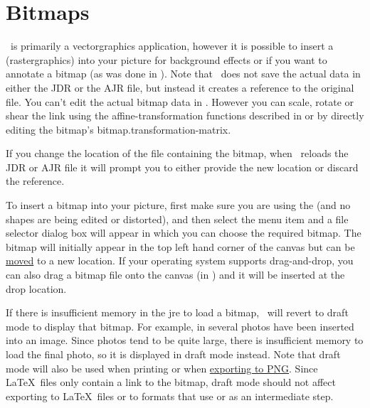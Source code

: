 
\section{Bitmaps}\label{sec:insertbitmap}


\FlowframTk\ is primarily a \gls{vectorgraphics} application,
however it is possible to insert a 
(\gls{rastergraphics}) into your picture for background effects or
if you want to annotate a \gls{bitmap} (as was done in
).  Note that
\FlowframTk\ does not save the actual  data in either
the \gls{JDR} or the \gls{AJR} file, but instead it creates a reference
to the original file. You can't edit the actual bitmap data in
\FlowframTk. However you can scale, rotate or shear the link
using the \gls{affine-transformation} functions described in 
 or by directly editing the
bitmap's \gls{bitmap.transformation-matrix}. 

\begin{important}
If you change the location of the file containing the bitmap, when
\FlowframTk\ reloads the \gls*{JDR} or \gls*{AJR} file it will
prompt you to either provide the new location or discard the reference.
\end{important}


To insert a \gls{bitmap} into your picture, first make sure you are using
the  (and no shapes are
being edited or distorted), and then select the menu item
 and a file selector dialog box will appear in which
you can choose the required \gls{bitmap}. The \gls{bitmap} will initially appear
in the top left hand corner of the \gls{canvas} but can be
\hyperref[sec:moveobjects]{moved} to a new location.  If your
operating system supports \gls{drag-and-drop}, you can also drag a
\gls{bitmap} file onto the \gls{canvas} (in \selectmode) and it will
be inserted at the drop location.

If there is insufficient memory in the \gls{jre} to load a bitmap,
\FlowframTk\ will revert to draft mode to display that bitmap.  For
example, in  several photos have been
inserted into an image. Since photos tend to be quite large, there
is insufficient memory to load the final photo, so it is displayed
in draft mode instead. Note that draft mode will also be used when
printing or when \hyperref[sec:exportpng]{exporting to PNG}. Since \LaTeX\ files
only contain a link to the bitmap, draft mode should not affect
exporting to \LaTeX\ files or to formats that use  or
 as an intermediate step.


